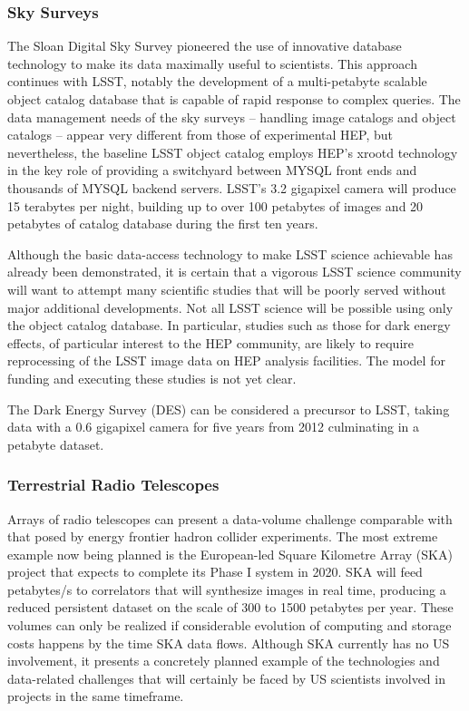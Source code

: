\subsubsection{Sky Surveys}
The Sloan Digital Sky Survey pioneered the use of innovative database technology to make 
its data maximally useful to scientists.  This approach continues with LSST, notably the 
development of a multi-petabyte scalable object catalog database that is capable of rapid 
response to complex queries.  The data management needs of the sky surveys -- handling image 
catalogs and object catalogs -- appear very different from those of experimental HEP, but 
nevertheless, the baseline LSST object catalog employs HEP's xrootd technology in the key 
role of providing a switchyard between MYSQL front ends and thousands of MYSQL backend servers.  
LSST's 3.2 gigapixel camera will produce 15 terabytes per night, building up to over 100 
petabytes of images and 20 petabytes of catalog database during the first ten years.

Although the basic data-access technology to make LSST science achievable has already been 
demonstrated, it is certain that a vigorous LSST science community will want to attempt many 
scientific studies that will be poorly served without major additional developments.  
Not all LSST science will be possible using only the object catalog database. In particular, 
studies such as those for dark energy effects, of particular interest to the HEP community, 
are likely to require reprocessing of the LSST image data on HEP analysis facilities.  
The model for funding and executing these studies is not yet clear.

The Dark Energy Survey (DES) can be considered a precursor to LSST, taking data with a 
0.6 gigapixel camera for five years from 2012 culminating in a petabyte dataset.

\subsubsection{Terrestrial Radio Telescopes}
Arrays of radio telescopes can present a data-volume challenge comparable with that 
posed by energy frontier hadron collider experiments.  The most extreme example now being 
planned is the European-led Square Kilometre Array (SKA) project that expects to complete 
its Phase I system in 2020. SKA will feed petabytes/s to correlators that will synthesize 
images in real time, producing a reduced persistent dataset on the scale of 300 to 1500 
petabytes per year.  These volumes can only be realized if considerable evolution of 
computing and storage costs happens by the time SKA data flows.  Although SKA currently 
has no US involvement, it presents a concretely planned example of the technologies and 
data-related challenges that will certainly be faced by US scientists involved in projects 
in the same timeframe.

